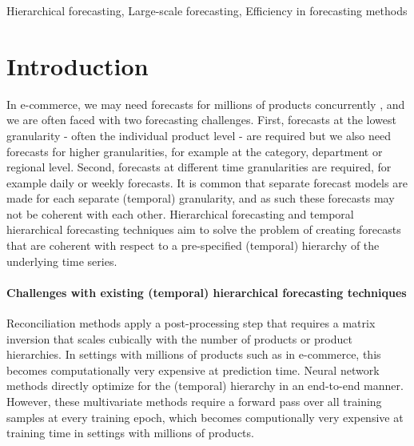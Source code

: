 \documentclass[preprint, 3p, times, twocolumn]{elsarticle}
\begin{document}
\begin{frontmatter}
\begin{abstract}

\end{abstract}

\begin{keyword}
  Hierarchical forecasting, Large-scale forecasting, Efficiency in forecasting methods
\end{keyword}

\end{frontmatter}


\section{Introduction}
In e-commerce, we may need forecasts for millions of products concurrently \cite{bose_probabilistic_2017}, and we are often faced with two forecasting challenges. First, forecasts at the lowest granularity - often the individual product level - are required but we also need forecasts for higher granularities, for example at the category, department or regional level. Second, forecasts at different time granularities are required, for example daily or weekly forecasts. It is common that separate forecast models are made for each separate (temporal) granularity, and as such these forecasts may not be coherent with each other. Hierarchical forecasting \cite{hyndman_optimal_2011} and temporal hierarchical forecasting techniques \cite{athanasopoulos_forecasting_2017,rangapuram_coherent_2023,theodosiou_forecasting_2021} aim to solve the problem of creating forecasts that are coherent with respect to a pre-specified (temporal) hierarchy of the underlying time series. 

\paragraph{Challenges with existing (temporal) hierarchical forecasting techniques} Reconciliation methods \cite{hyndman_optimal_2011,athanasopoulos_forecasting_2017,wickramasuriya_optimal_2019} apply a post-processing step that requires a matrix inversion that scales cubically with the number of products or product hierarchies. In settings with millions of products such as in e-commerce, this becomes computationally very expensive at prediction time. Neural network methods \cite{rangapuram_endtoend_2021,rangapuram_coherent_2023} directly optimize for the (temporal) hierarchy in an end-to-end manner. However, these multivariate methods require a forward pass over all training samples at every training epoch, which becomes computionally very expensive at training time in settings with millions of products. 
  
\end{document}
